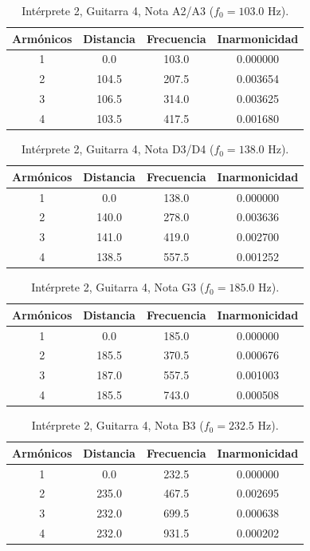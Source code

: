 \begin{table}[htbp]
  \centering
 \small
  \caption{Intérprete 2, Guitarra 4, Nota A2/A3 ($f_0 = 103.0$ Hz).}
  \label{tab:interprete2_g4_a2_a3}
  \begin{tabular}{cccc}
  \toprule
  Armónicos & Distancia & Frecuencia & Inarmonicidad \\
  \midrule
  1 & 0.0 & 103.0 & 0.000000 \\
  2 & 104.5 & 207.5 & 0.003654 \\
  3 & 106.5 & 314.0 & 0.003625 \\
  4 & 103.5 & 417.5 & 0.001680 \\
  \bottomrule
  \end{tabular}
\end{table}

\begin{table}[htbp]
  \centering
 \small
  \caption{Intérprete 2, Guitarra 4, Nota D3/D4 ($f_0 = 138.0$ Hz).}
  \label{tab:interprete2_g4_d3_d4}
  \begin{tabular}{cccc}
  \toprule
  Armónicos & Distancia & Frecuencia & Inarmonicidad \\
  \midrule
  1 & 0.0 & 138.0 & 0.000000 \\
  2 & 140.0 & 278.0 & 0.003636 \\
  3 & 141.0 & 419.0 & 0.002700 \\
  4 & 138.5 & 557.5 & 0.001252 \\
  \bottomrule
  \end{tabular}
\end{table}

\begin{table}[htbp]
  \centering
 \small
  \caption{Intérprete 2, Guitarra 4, Nota G3 ($f_0 = 185.0$ Hz).}
  \label{tab:interprete2_g4_g3}
  \begin{tabular}{cccc}
  \toprule
  Armónicos & Distancia & Frecuencia & Inarmonicidad \\
  \midrule
  1 & 0.0 & 185.0 & 0.000000 \\
  2 & 185.5 & 370.5 & 0.000676 \\
  3 & 187.0 & 557.5 & 0.001003 \\
  4 & 185.5 & 743.0 & 0.000508 \\
  \bottomrule
  \end{tabular}
\end{table}

\begin{table}[htbp]
  \centering
 \small
  \caption{Intérprete 2, Guitarra 4, Nota B3 ($f_0 = 232.5$ Hz).}
  \label{tab:interprete2_g4_b3}
  \begin{tabular}{cccc}
  \toprule
  Armónicos & Distancia & Frecuencia & Inarmonicidad \\
  \midrule
  1 & 0.0 & 232.5 & 0.000000 \\
  2 & 235.0 & 467.5 & 0.002695 \\
  3 & 232.0 & 699.5 & 0.000638 \\
  4 & 232.0 & 931.5 & 0.000202 \\
  \bottomrule
  \end{tabular}
\end{table}

